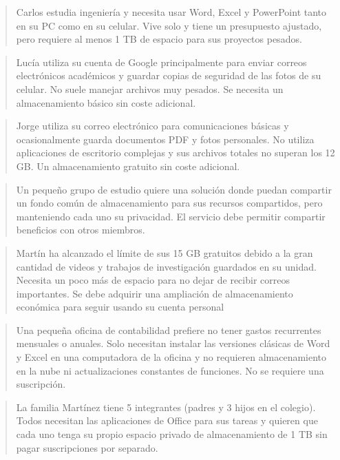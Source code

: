 \documentclass[letterpaper,10pt,spanish]{sphinxmanual}
\begin{document}
\begin{enumerate}
\begin{quote}
\sphinxAtStartPar
{} Carlos estudia ingeniería y necesita usar Word, Excel y PowerPoint tanto en su PC como en su celular. Vive solo y tiene un presupuesto ajustado, pero requiere al menos 1 TB de espacio para sus proyectos pesados.
\end{quote}
\begin{quote}

\sphinxAtStartPar
{} Lucía utiliza su cuenta de Google principalmente para enviar correos electrónicos académicos y guardar copias de seguridad de las fotos de su celular. No suele manejar archivos muy pesados. Se necesita un almacenamiento básico sin coste adicional.
\end{quote}
\begin{quote}

\sphinxAtStartPar
{} Jorge utiliza su correo electrónico para comunicaciones básicas y ocasionalmente guarda documentos PDF y fotos personales. No utiliza aplicaciones de escritorio complejas y sus archivos totales no superan los 12 GB. Un almacenamiento gratuito sin coste adicional.
\end{quote}
\begin{quote}

\sphinxAtStartPar
{} Un pequeño grupo de estudio quiere una solución donde puedan compartir un fondo común de almacenamiento para sus recursos compartidos, pero manteniendo cada uno su privacidad. El servicio debe permitir compartir beneficios con otros miembros.
\end{quote}
\begin{quote}

\sphinxAtStartPar
{} Martín ha alcanzado el límite de sus 15 GB gratuitos debido a la gran cantidad de videos y trabajos de investigación guardados en su unidad. Necesita un poco más de espacio para no dejar de recibir correos importantes. Se debe adquirir una ampliación de almacenamiento económica para seguir usando su cuenta personal
\end{quote}
\begin{quote}

\sphinxAtStartPar
{} Una pequeña oficina de contabilidad prefiere no tener gastos recurrentes mensuales o anuales. Solo necesitan instalar las versiones clásicas de Word y Excel en una computadora de la oficina y no requieren almacenamiento en la nube ni actualizaciones constantes de funciones. No se requiere una suscripción.
\end{quote}
\begin{quote}

\sphinxAtStartPar
{} La familia Martínez tiene 5 integrantes (padres y 3 hijos en el colegio). Todos necesitan las aplicaciones de Office para sus tareas y quieren que cada uno tenga su propio espacio privado de almacenamiento de 1 TB sin pagar suscripciones por separado.
\end{quote}

\end{enumerate}
\end{document}
